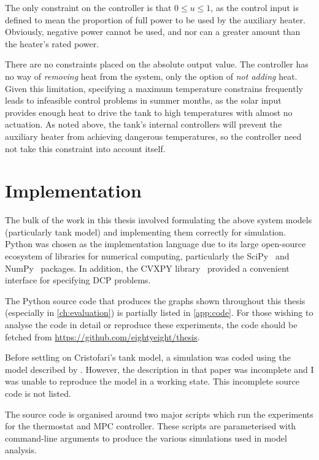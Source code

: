 The only constraint on the controller is that $0 \le u \le 1$, as the control input is defined to mean the proportion of full power to be used by the auxiliary heater.
Obviously, negative power cannot be used, and nor can a greater amount than the heater's rated power.

There are no constraints placed on the absolute output value.
The controller has no way of \emph{removing} heat from the system, only the option of \emph{not adding} heat.
Given this limitation, specifying a maximum temperature constrains frequently leads to infeasible control problems in summer months, as the solar input provides enough heat to drive the tank to high temperatures with almost no actuation.
As noted above, the tank's internal controllers will prevent the auxiliary heater from achieving dangerous temperatures, so the controller need not take this constraint into account itself.

\section{Implementation}

The bulk of the work in this thesis involved formulating the above system models (particularly tank model) and implementing them correctly for simulation.
Python was chosen as the implementation language due to its large open-source ecosystem of libraries for numerical computing, particularly the SciPy~\cite{SCIPY} and NumPy~\cite{Walt11} packages.
In addition, the CVXPY library~\cite{CVXPY} provided a convenient interface for specifying DCP problems.

The Python source code that produces the graphs shown throughout this thesis (especially in \autoref{ch:evaluation}) is partially listed in \autoref{app:code}.
For those wishing to analyse the code in detail or reproduce these experiments, the code should be fetched from \url{https://github.com/eightyeight/thesis}.

Before settling on Cristofari's tank model, a simulation was coded using the model described by \textcite{Pfeiffer11}.
However, the description in that paper was incomplete and I was unable to reproduce the model in a working state.
This incomplete source code is not listed.

The source code is organised around two major scripts which run the experiments for the thermostat and MPC controller.
These scripts are parameterised with command-line arguments to produce the various simulations used in model analysis.
